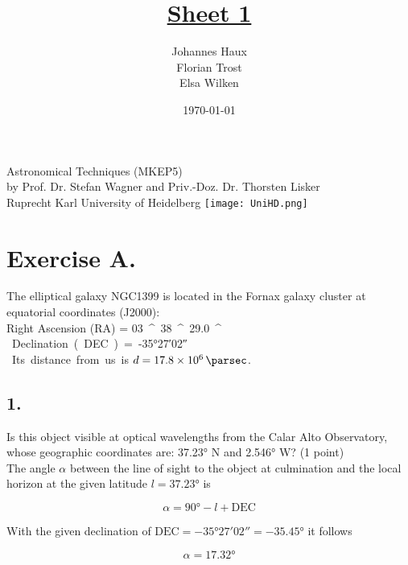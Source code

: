 \documentclass[11pt,a4paper,twoside]{article}
\title{\LARGE \underline {Sheet 1}}
\author{Johannes Haux \\ Florian Trost \\ Elsa Wilken}
\date{\today}
\begin{document}
\maketitle
\thispagestyle{empty}

\begin{center}
  Astronomical Techniques (MKEP5) \\
  \baselineskip35pt
  by Prof. Dr. Stefan Wagner and Priv.-Doz. Dr. Thorsten Lisker \\
  \baselineskip60pt
  Ruprecht Karl University of Heidelberg
\vskip 40pt
\texttt{[image: UniHD.png]}

\end{center}

\newpage
\setcounter{page}{1}		%

\section*{Exercise A.} 

The elliptical galaxy NGC1399 is located in the Fornax galaxy cluster at equatorial coordinates (J2000): \\

Right Ascension (RA) =  \SI{03}{^\hour} \SI{38}{^\minute} \SI{29.0}{^\second} \\
Declination (DEC) = \ang{-35;27;02} \\

Its distance from us is $d = \SI{17.8e6}{\parsec}$. \\

\subsection*{1.} Is this object visible at optical wavelengths from the Calar Alto Observatory, whose geographic coordinates are: \ang{37.23} N and \ang{2.546} W? (1 point) \\

The angle $\alpha$ between the line of sight to the object at culmination and the local horizon at the given latitude $l = \ang{37.23}$ is 

\begin{equation}
 \alpha = \ang{90} - l + \text{DEC}
\end{equation}

With the given declination of $\text{DEC} = \ang{-35;27;02} = \ang{-35.45}$ it follows 

\begin{equation}
 \alpha = \ang{17.32}
\end{equation}
\end{document}

